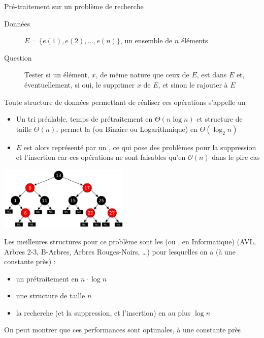 \documentclass[aspectratio=1610,francais,envcountsect]{beamer}
\begin{document}
\begin{frame}[allowframebreaks]{Pré-traitement sur un problème de
    recherche}

  \begin{definition}[Recherche]
    \begin{description}
    \item [Données] $E = \{e(1), e(2), \ldots , e(n)\}$, un ensemble
      de $n$ éléments
    \item [Question] Tester si un élément, $x$, de même nature que
      ceux de $E$, est dans $E$ et, éventuellement, si oui, le
      supprimer $x$ de $E$, et sinon le rajouter à $E$
    \end{description}
  \end{definition}

  Toute structure de données permettant de réaliser ces opérations
  s’appelle un 

  \begin{itemize}
  \item Un tri préalable, temps de prétraitement en $\Theta(n\log n)$
    et structure de taille $\Theta(n)$, permet la  (ou Binaire ou Logarithmique) en $\Theta(\log_2n)$
  \item $E$ est alors représenté par un , ce
    qui pose des problèmes pour la suppression et l’insertion car ces
    opérations ne sont faisables qu’en $\mathcal{O}(n)$ dans le pire
    cas
  \end{itemize}

  \framebreak

  \begin{center}
    \includegraphics[height=3cm]{redblacktree}
  \end{center}

  Les meilleures structures pour ce problème sont les
   (ou , en Informatique)
   (AVL, Arbres 2-3, B-Arbres,
  Arbres Rouges-Noirs, \ldots) pour lesquelles on a (à une constante
  près) :

  \begin{itemize}
  \item un prétraitement en $n\cdot\log n$
  \item une structure de taille $n$
  \item la recherche (et la suppression, et l’insertion) en au plus
    $\log n$
  \end{itemize}

  On peut montrer que ces performances sont optimales, à une constante
  près
\end{frame}
\end{document}
